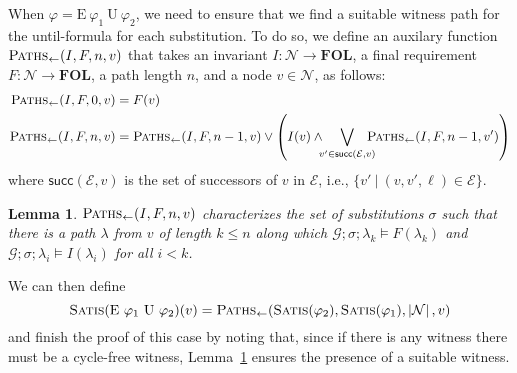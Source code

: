 \documentclass{eptcs}
\newtheorem{lemma}{Lemma}
\newcommand{\EU}[2]{\textrm{E}\ #1\ \textrm{U}\ #2}
\newcommand{\foctlmod}[4]{#1;#2;#3\vDash #4}
\newcommand{\satis}[1]{\textsc{Satis}(#1)}
\newcommand{\PathsBackRaw}{\textsc{Paths}_{\leftarrow}}
\newcommand{\PathsBack}[4]{\PathsBackRaw(#1,#2,#3,#4)}
\newcommand{\successors}[2]{\mathsf{succ}(#1,#2)}
\newcommand{\card}[1]{\ensuremath{\left|#1\right|}}
\newcommand{\FOL}{\textbf{FOL}}
\begin{document}
When $\varphi=\EU{\varphi_1}{\varphi_2}$, we need to ensure that we find a suitable witness path for the until-formula
for each substitution. To do so, we define an auxilary function $\PathsBack{I}{F}{n}{v}$
that takes an invariant $I\colon\mathcal{N}\to\FOL$, a final requirement
$F\colon\mathcal{N}\to\FOL$, a path length $n$, and a node $v\in\mathcal{N}$, as follows:
\begin{align*}
\PathsBack{I}{F}{0}{v}&=F(v)\\
\PathsBack{I}{F}{n}{v}&=\PathsBack{I}{F}{n-1}{v}
                             \lor\left(I(v)
                         \land\!\!\!\bigvee_{v'\in
\successors{\mathcal{E}}{v}}\!\!\!\!\!\PathsBack{I}{F}{n-1}{v'}\right)
\end{align*} where $\successors{\mathcal{E}}{v}$ is the set of successors of $v$ in $\mathcal{E}$, i.e., $\{v'\ |\ (v, v', \ell) \in \mathcal{E}\}$.
\begin{lemma}\label{lem:pathsback}
$\PathsBack{I}{F}{n}{v}$ characterizes the set of substitutions $\sigma$ such that 
there is a path $\lambda$ from $v$ of length $k \le n$ along which $\foctlmod{\mathcal{G}}{\sigma}{\lambda_k}{F(\lambda_k)}$ and $\foctlmod{\mathcal{G}}{\sigma}{\lambda_i}{I(\lambda_i)}$ for all
$i < k$.
\end{lemma}
We can then define 
$$\satis{\EU{\varphi_1}{\varphi_2}}(v)=\PathsBack{\satis{\varphi_2}}{\satis{\varphi_1}}{\card{\mathcal{N}}}{v}$$
and finish the proof of this case by noting that, since if there is any witness 
there must be a cycle-free witness, Lemma~\ref{lem:pathsback} ensures the presence of a suitable witness.
\end{document}
